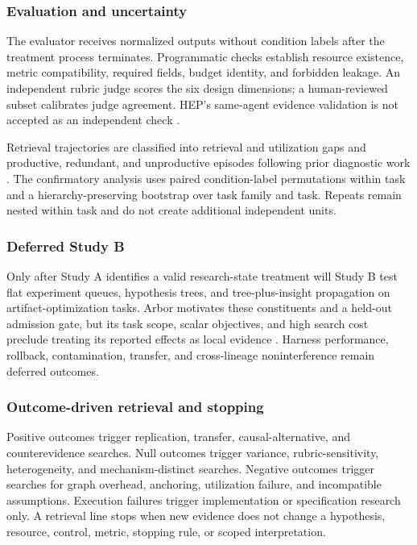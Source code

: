 \documentclass[11pt,a4paper]{article}
\begin{document}
\subsubsection{Evaluation and uncertainty}

The evaluator receives normalized outputs without condition labels after the
treatment process terminates.  Programmatic checks establish resource existence,
metric compatibility, required fields, budget identity, and forbidden leakage.
An independent rubric judge scores the six design dimensions; a human-reviewed
subset calibrates judge agreement.  HEP's same-agent evidence validation is not
accepted as an independent check \citep{hep2026}.

Retrieval trajectories are classified into retrieval and utilization gaps and
productive, redundant, and unproductive episodes following prior diagnostic
work \citep{searchdiagnosis2026}.  The confirmatory analysis uses paired
condition-label permutations within task and a hierarchy-preserving bootstrap
over task family and task.  Repeats remain nested within task and do not create
additional independent units.

\subsubsection{Deferred Study B}

Only after Study A identifies a valid research-state treatment will Study B test
flat experiment queues, hypothesis trees, and tree-plus-insight propagation on
artifact-optimization tasks.  Arbor motivates these constituents and a held-out
admission gate, but its task scope, scalar objectives, and high search cost
preclude treating its reported effects as local evidence \citep{arbor2026}.
Harness performance, rollback, contamination, transfer, and cross-lineage
noninterference remain deferred outcomes.

\subsubsection{Outcome-driven retrieval and stopping}

Positive outcomes trigger replication, transfer, causal-alternative, and
counterevidence searches.  Null outcomes trigger variance, rubric-sensitivity,
heterogeneity, and mechanism-distinct searches.  Negative outcomes trigger
searches for graph overhead, anchoring, utilization failure, and incompatible
assumptions.  Execution failures trigger implementation or specification research
only.  A retrieval line stops when new evidence does not change a hypothesis,
resource, control, metric, stopping rule, or scoped interpretation.
\end{document}
